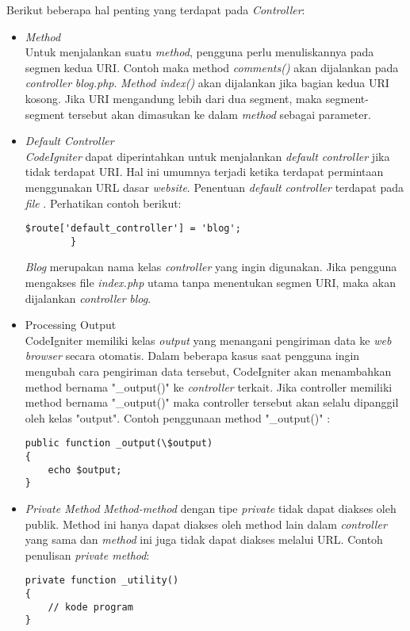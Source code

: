 	Berikut beberapa hal penting yang terdapat pada \textit{Controller}:
	\begin{itemize}
		\item \textit{Method} \\
		Untuk menjalankan suatu \textit{method}, pengguna perlu menuliskannya pada segmen kedua URI. Contoh  maka method \textit{comments()} akan dijalankan pada \textit{controller} \textit{blog.php}. \textit{Method index()} akan dijalankan jika bagian kedua URI kosong. Jika URI mengandung lebih dari dua segment, maka segment-segment tersebut akan dimasukan ke dalam \textit{method} sebagai parameter.
		
		\item \textit{Default Controller} \\
		\textit{CodeIgniter} dapat diperintahkan untuk menjalankan \textit{default controller} jika tidak terdapat URI. Hal ini umumnya terjadi ketika terdapat permintaan menggunakan URL dasar \textit{website}. Penentuan \textit{default controller} terdapat pada \textit{file} . Perhatikan contoh berikut:
		\begin{lstlisting}[basicstyle=\ttfamily, frame=single,
columns=fullflexible, keepspaces=true, breaklines=true]
$route['default_controller'] = 'blog';
		}
\end{lstlisting} 
		\textit{Blog} merupakan nama kelas \textit{controller} yang ingin digunakan. Jika pengguna mengakses file \textit{index.php} utama tanpa menentukan segmen URI, maka akan dijalankan \textit{controller} \textit{blog}.
		
		\item Processing Output \\
		CodeIgniter memiliki kelas \textit{output} yang menangani pengiriman data ke \textit{web browser} secara otomatis. Dalam beberapa kasus saat pengguna ingin mengubah cara pengiriman data tersebut, CodeIgniter akan menambahkan method bernama "\_output()" ke \textit{controller} terkait. Jika controller memiliki method bernama "\_output()" maka controller tersebut akan selalu dipanggil oleh kelas "output".
		Contoh penggunaan method "\_output()" : 
		\begin{lstlisting}[basicstyle=\ttfamily, frame=single,
columns=fullflexible, keepspaces=true, breaklines=true]
public function _output(\$output)
{
	echo $output;
}
\end{lstlisting}
		
		\item \textit{Private Method}
		\textit{Method-method} dengan tipe \textit{private} tidak dapat diakses oleh publik. Method ini hanya dapat diakses oleh method lain dalam \textit{controller} yang sama dan \textit{method} ini juga tidak dapat diakses melalui URL. Contoh penulisan \textit{private method}:
		\begin{lstlisting}[basicstyle=\ttfamily, frame=single,
columns=fullflexible, keepspaces=true, breaklines=true]
private function _utility()
{
	// kode program
}
\end{lstlisting}
		

\end{itemize}
